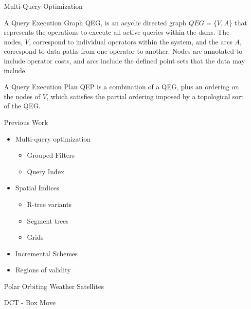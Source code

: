\documentclass[final,total,bgColor,slideColor,pdf,ps2pdf,default,noaccumulate]{prosper}
\newcommand{\ac}[1]{#1}
\begin{document}
\begin{slide}{Multi-Query Optimization}

  \vspace*{0.5cm}

  A {\blue Query Execution Graph \ac{QEG}}, is an acyclic directed
  graph $QEG = \{V,A\}$ that represents the operations to execute all
  active queries within the \ac{dsms}.  The nodes, $V$, correspond to
  individual operators within the system, and the arcs $A$, correspond
  to data paths from one operator to another.  Nodes are annotated to
  include operator costs, and arcs include the defined point sets that
  the data may include.

  \vspace*{1cm}

  A {\blue Query Execution Plan \ac{QEP}} is a combination of a
  \ac{QEG}, plus an ordering on the nodes of $V$, which satisfies the
  partial ordering imposed by a topological sort of the \ac{QEG}.
  
\end{slide}

\begin{slide}[R]{Previous Work}
  \begin{minipage}[t]{6cm}
  \begin{itemize}
  \item Multi-query optimization
    \begin{itemize}
    \item Grouped Filters
    \item Query Index
    \end{itemize}
  \item Spatial Indices
    \begin{itemize}
    \item R-tree variants
    \item Segment trees
    \item Grids
    \end{itemize}
  \item Incremental Schemes
  \item Regions of validity
  \end{itemize}
  \end{minipage}
  \begin{minipage}[t]{5cm}
    \vspace*{0pt}
    \scalebox{0.6}{}
  \end{minipage}
\end{slide}


\begin{slide}[R]{Polar Orbiting Weather Satellites }

\end{slide}

\begin{slide}{DCT - Box Move}
  \centering
  \scalebox{0.8}{}
\end{slide}
\end{document}
